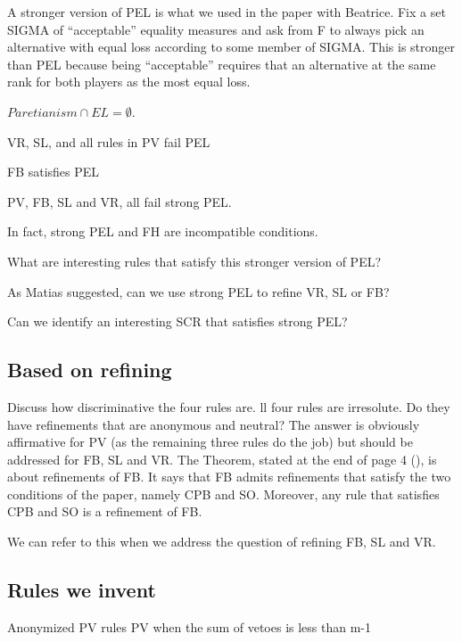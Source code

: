 \documentclass[version=3.21, pagesize, twoside=off, bibliography=totoc, DIV=calc, fontsize=12pt, a4paper]{scrartcl}
\begin{document}
A stronger version of PEL is what we used in the paper with Beatrice. Fix a set SIGMA of “acceptable” equality measures and ask from F to always pick an alternative with equal loss according to some member of SIGMA. This is stronger than PEL because being “acceptable” requires that an alternative at the same rank for both players as the most equal loss.

$Paretianism ∩ EL = \emptyset$.



\begin{proposition}
VR, SL, and all rules in PV fail PEL
\end{proposition}
\begin{proposition}
FB satisfies PEL
\end{proposition}


PV, FB, SL and VR, all fail strong PEL. 

In fact, strong PEL and FH are incompatible conditions. 


What are interesting rules that satisfy this stronger version of PEL? 

As Matias suggested, can we use strong PEL to refine VR, SL or FB?

Can we identify an interesting SCR that satisfies strong PEL?

\subsection{Based on refining}
Discuss how discriminative the four rules are. ll four rules are irresolute. Do they have refinements that are anonymous and neutral? The answer is obviously affirmative for PV (as the remaining three rules do the job) but should be addressed for FB, SL and VR. 
The Theorem, stated at the end of page 4 (), is about refinements of FB. It says that FB admits refinements that satisfy the two conditions of the paper, namely CPB and SO. Moreover, any rule that satisfies CPB and SO is a refinement of FB.

We can refer to this when we address the question of refining FB, SL and VR.









\subsection{Rules we invent}
Anonymized PV rules
PV when the sum of vetoes is less than m-1
\end{document}
